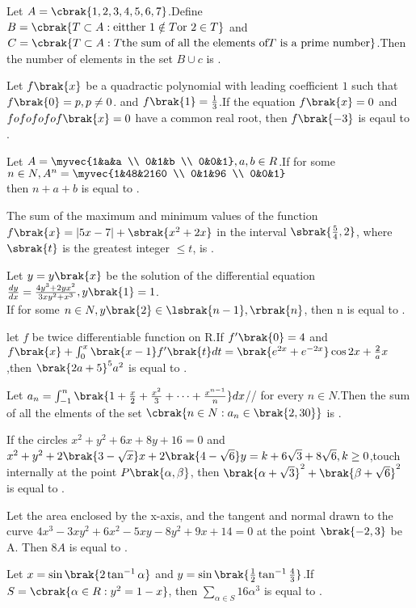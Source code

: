 
\iffalse
  \title{2022}
  \author{EE24BETCH11043}
  \section{integer}
\fi
    \item Let $A = \cbrak{1,2,3,4,5,6,7}$.Define $B = \cbrak{T \subset A : \text{eitther } 1 \notin T \text{or } 2 \in T}$ and $C = \cbrak{T \subset A : T \text{the sum of all the elements of} T \text{ is a prime number}}$.Then the number of elements in the set $B \cup c$ is . \hfill{}
\item Let $f\brak{x}$ be a quadractic polynomial with leading coefficient $1$ such that $f\brak{0} = p,p \neq 0$. and $f\brak{1}=\frac{1}{3}$.If the equation $f\brak{x}=0$ and $fo fo fo fo f\brak{x} = 0$ have a common real root, then $f\brak{-3}$ is eqaul to . \hfill{}
\item Let $A = \myvec{1&a&a \\ 0&1&b \\ 0&0&1} ,a,b \in R$.If for some $n\in N,A^n = \myvec{1&48&2160 \\ 0&1&96 \\ 0&0&1}$ \\
then $n+a+b$ is equal to .  \hfill{} 
\item The sum of the maximum and minimum values of the function $f\brak{x} = |5x-7| + \sbrak{x^2+2x}$ in the interval $\sbrak{\frac{5}{4},2}$, where $\sbrak{t}$ is the greatest integer $\leq t$, is .  \hfill{}
\item Let $y=y\brak{x}$ be the solution of the differential equation \\
$\frac{dy}{dx} = \frac{4y^3+2yx^2}{3xy^2+x^3},y\brak{1}=1$. \\
If for some $n \in N, y\brak{2} \in \lsbrak{n-1},\rbrak{n}$, then n is equal to . \hfill{}
\item let $f$ be twice differentiable function on R.If $f'\brak{0} = 4$ and ${f\brak{x}+ \int_{0}^{x} \brak{x-1}f'\brak{t}dt =  \brak{e^{2x} + e^{-2x}}\cos{2x} + \frac{2}{a} x}$,then $\brak{2a+5}^5a^2$ is equal to .  \hfill{}
\item Let $a_n=\int_{-1}^{n}\brak{1+\frac{x}{2}+\frac{x^2}{3}+\dots+\frac{x^{n-1}}{n}}dx$//
for every $n \in N$.Then the sum of all the elments of the set $\cbrak{n \in N: a_n \in \brak{2,30}}$ is .  \hfill{}
\item If the circles $x^2+y^2+6x+8y+16=0$ and ${x^2+y^2+2\brak{3-\sqrt{x}}x+2\brak{4-\sqrt{6}}y = k+6\sqrt{3} +8\sqrt{6},k\ge 0}$,touch internally at the point 
$P\brak{\alpha,\beta}$, then $\brak{\alpha+\sqrt{3}}^2+\brak{\beta+\sqrt{6}}^2$ is equal to . \hfill{}
\item Let the area enclosed by the x-axis, and the tangent and normal drawn to the curve $4x^3-3xy^2+6x^2-5xy-8y^2+9x+14 = 0$ at the point $\brak{-2,3}$ be A. Then $8A$ is equal to . \hfill{}
\item Let $x=\sin\brak{2\tan^{-1}\alpha}$ and $y=\sin\brak{\frac{1}{2}\tan^{-1}\frac{4}{3}}$.If ${S=\cbrak{\alpha \in R : y^2=1-x}}$, then ${\sum_{\alpha \in S} 16\alpha^3}$ is equal to . \hfill{}

